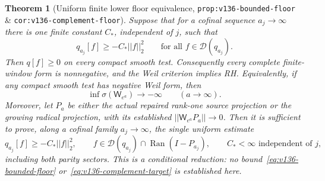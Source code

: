 \documentclass[11pt]{article}
\def\norm#1{||#1||}%
\newtheorem{theorem}{Theorem}[section]
\theoremstyle{remark}
\newcommand{\norm}[1]{\left\lVert #1\right\rVert}
\begin{document}
\begin{theorem}[Uniform finite lower floor equivalence, \texttt{prop:v136-bounded-floor} \& \texttt{cor:v136-complement-floor}]
\label{thm:bounded-floor}
Suppose that for a cofinal sequence $a_j \to \infty$ there is one finite constant $C_*$, independent of $j$, such that
\begin{equation}\label{eq:v136-bounded-floor}
  q_{a_j}[f] \ge -C_*\norm{f}_2^2 \qquad \text{for all } f \in \mathcal{D}(q_{a_j}).
\end{equation}
Then $q[f] \ge 0$ on every compact smooth test. Consequently every complete finite-window form is nonnegative, and the Weil criterion implies RH. Equivalently, if any compact smooth test has negative Weil form, then
\begin{equation}\label{eq:v136-negative-divergence}
  \inf\sigma(\mathsf{W}_{e^a}) \longrightarrow -\infty \qquad (a \longrightarrow \infty).
\end{equation}
Moreover, let $P_a$ be either the actual repaired rank-one source projection or the growing radical projection, with its established $\norm{\mathsf{W}_{e^a}P_a} \to 0$. Then it is sufficient to prove, along a cofinal family $a_j \to \infty$, the single uniform estimate
\begin{equation}\label{eq:v136-complement-target}
  q_{a_j}[f] \ge -C_*\norm{f}_2^2, \qquad f \in \mathcal{D}(q_{a_j}) \cap \operatorname{Ran}(I - P_{a_j}), \qquad C_* < \infty \text{ independent of } j,
\end{equation}
including both parity sectors. This is a conditional reduction: no bound~\eqref{eq:v136-bounded-floor} or~\eqref{eq:v136-complement-target} is established here.
\end{theorem}
\end{document}

